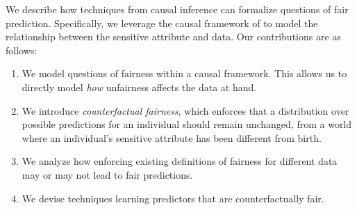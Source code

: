% 

We describe how techniques from causal inference can formalize questions of fair prediction. Specifically, we
leverage the causal framework of 
\citet{pearl2009causal} to model the relationship between the sensitive
attribute and data. Our contributions are as follows:
\begin{enumerate}
    \item We model questions of fairness within a causal framework. This allows us to directly model \emph{how} unfairness affects the data at hand.
    \item We introduce \emph{counterfactual fairness}, which enforces that a distribution over possible predictions for an individual should remain unchanged, from a world where an individual's sensitive attribute has been different from birth.
    \item We analyze how enforcing existing definitions of fairness for different data may or may not lead to fair predictions.
    \item We devise techniques learning predictors that are counterfactually fair.
\end{enumerate}












